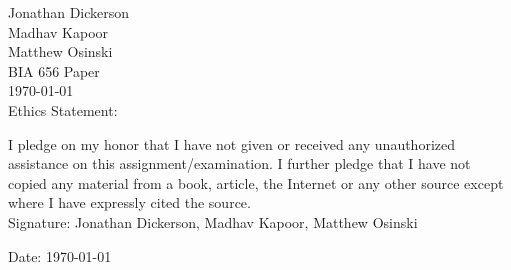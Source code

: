 \documentclass{article}
\begin{document}
Jonathan Dickerson\\
Madhav Kapoor\\
Matthew Osinski\\
BIA 656 Paper\\
\today\\



Ethics Statement:

I pledge on my honor that I have not given or received any unauthorized 
assistance on this assignment/examination. I further pledge that I have not copied 
any material from a book, article, the Internet or any other source except where I 
have expressly cited the source. \\

Signature: Jonathan Dickerson, Madhav Kapoor, Matthew Osinski

Date: \today
\end{document}
